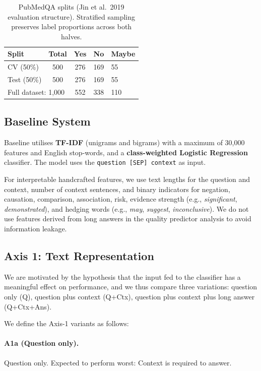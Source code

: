 \documentclass[11pt]{article}
\begin{document}
\begin{table}[t]
\centering
\caption{PubMedQA splits (Jin et al.\ 2019 evaluation structure). Stratified sampling preserves label proportions across both halves.}
\label{tab:dataset}
\small
\begin{tabular}{lcccl}
\toprule
\textbf{Split} & \textbf{Total} & \textbf{Yes} & \textbf{No} & \textbf{Maybe} \\
\midrule
CV (50\%)     & 500 & 276 & 169 & 55 \\
Test (50\%)   & 500 & 276 & 169 & 55 \\
\midrule
\multicolumn{2}{l}{Full dataset: 1{,}000} & 552 & 338 & 110 \\
\bottomrule
\end{tabular}
\end{table}

\subsection{Baseline System}

Baseline utilises \textbf{TF-IDF} (unigrams and bigrams) with a maximum of 30{,}000 features and English stop-words, and a \textbf{class-weighted Logistic Regression} classifier. The model uses the \texttt{question [SEP] context} as input.

For interpretable handcrafted features, we use text lengths for the question and context, number of context sentences, and binary indicators for negation, causation, comparison, association, risk, evidence strength (e.g., \emph{significant}, \emph{demonstrated}), and hedging words (e.g., \emph{may}, \emph{suggest}, \emph{inconclusive}). We do not use features derived from long answers in the quality predictor analysis to avoid information leakage.

\subsection{Axis 1: Text Representation}
\label{sec:axis1}

We are motivated by the hypothesis that the input fed to the classifier has a meaningful effect on performance, and we thus compare three variations: question only (Q), question plus context (Q+Ctx), question plus context plus long answer (Q+Ctx+Ans).

We define the Axis-1 variants as follows:

\paragraph{A1a (Question only).} Question only. Expected to perform worst: Context is required to answer.
\end{document}
